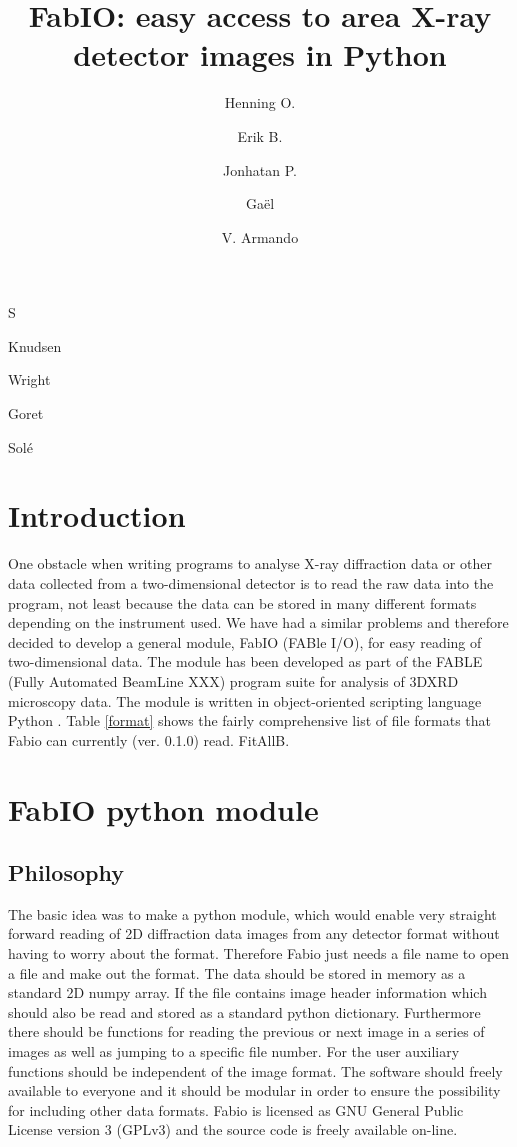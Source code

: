 \documentclass{iucr}
\begin{document}
\title{FabIO: easy access to area X-ray detector images in Python}
    \author[a]{Henning O.}{S\orensen}
    \author[a]{Erik B.}{Knudsen}
    \author[b]{Jonhatan P.}{Wright}
	\author[b]{Ga\"el}{Goret}
	\author[b]{V. Armando}{Sol\'e}
	

\maketitle

\section{Introduction}

One obstacle when writing programs to analyse X-ray diffraction data or other
data collected from a two-dimensional detector is to read the raw data into the
program, not least because the data can be stored in many different formats
depending on the instrument used. 
We have had a similar problems and therefore decided to develop a general module, 
FabIO (FABle I/O), for easy reading of two-dimensional data. 
The module has been developed as part of the FABLE (Fully Automated BeamLine 
XXX) program suite for analysis of 3DXRD microscopy
data\cite{3dxrd}. The module is written in object-oriented scripting language
Python\cite{python} . Table \ref{format} shows the fairly comprehensive list of
file formats that Fabio can currently (ver. 0.1.0) read. FitAllB\cite{fitallb}.


\section{FabIO python module} 

\subsection{Philosophy}

The basic idea was to make a python module, which would enable very straight
forward reading of 2D diffraction  data images from any detector format
without having to worry about the format.
Therefore Fabio just needs a file name to open a file and make out the format. 
The data should be stored in memory as a standard 2D numpy array\cite{numpy}.
If the file contains image header information which should also be read and 
stored as a standard python dictionary. 
Furthermore there should be functions for reading the previous or next image 
in a series of images as well as jumping to a specific file number. 
For the user auxiliary functions should be independent of the image format.
The software should freely available to everyone and it should be modular in 
order to ensure the possibility for including other data formats. 
Fabio is licensed as GNU General Public License version 3 (GPLv3) 
and the source code is freely available on-line\cite{fabio}.
\end{document}
